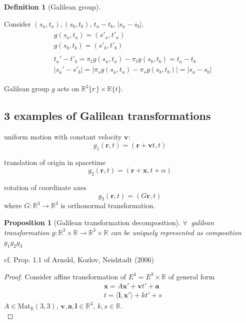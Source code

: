 \documentclass[10pt]{amsart}
\newtheorem{proposition}{Proposition}
\newtheorem{definition}{Definition}
\begin{document}
\begin{multicols*}{2}
\begin{definition}[Galilean group]
\end{definition}

Consider $(s_a,t_a), (s_b, t_b)$, $t_a - t_b$, $|s_a - s_b|$.
\[
\begin{gathered}
\begin{aligned}
	& g(s_a, t_a) = (s'_a, t'_a) \\ 
	& g(s_b,t_b) = (s'_b, t'_b)
\end{aligned} \\
\begin{aligned}
& t_a' - t'_b = \pi_tg(s_a, t_a) - \pi_tg(s_b, t_b) = t_a - t_b \\ 
& |s_a' - s'_b| = | \pi_s g(s_a,t_a) - \pi_sg(s_b,t_b) | = |s_a-s_b|
\end{aligned}
\end{gathered}
\]

Galilean group $g$ acts on $\mathbb{R}^3\lbrace \mathbb{r} \rbrace \times \mathbb{R} \lbrace t \rbrace$. \\

\subsection{3 examples of Galilean transformations}

uniform motion with constant velocity $\mathbf{v}$:
\begin{equation}
g_1(\mathbf{r}, t) = (\mathbf{r} + \mathbf{v} t, t)
\end{equation}

translation of origin in spacetime
\begin{equation}
g_2(\mathbf{r}, t) = (\mathbf{r} + \mathbf{x} , t + \alpha )
\end{equation}

rotation of coordinate axes
\begin{equation}
g_3(\mathbf{r}, t) = (G \mathbf{r}, t)
\end{equation}
where $G: \mathbb{R}^3 \to \mathbb{R}^3$ is orthonormal transformation.

\begin{proposition}[Galilean transformation decomposition]
	$\forall \, $ galilean transformation $g: \mathbb{R}^3 \times \mathbb{R} \to \mathbb{R}^3 \times \mathbb{R}$ can be uniquely represented as composition $g_1g_2 g_3$
\end{proposition}
cf. Prop. 1.1 of Arnold, Kozlov, Neishtadt (2006) \cite{AKN2006} 

\begin{proof}
Consider affine transformation of $E^4 = E^3 \times \mathbb{R}$ of general form
\[
\begin{aligned}
& \mathbf{x} = A\mathbf{x}' + \mathbf{v} t' + \mathbf{a} \\ 
& t = \langle \mathbf{l} , \mathbf{x}' \rangle + kt' + s 
\end{aligned}
\]
$A \in \text{Mat}_{\mathbb{R}}(3,3)$, $\mathbf{v}, \mathbf{a}, \mathbf{l} \in \mathbb{R}^3$, $k, s \in \mathbb{R}$. \\



\end{proof}
\end{multicols*}
\end{document}
